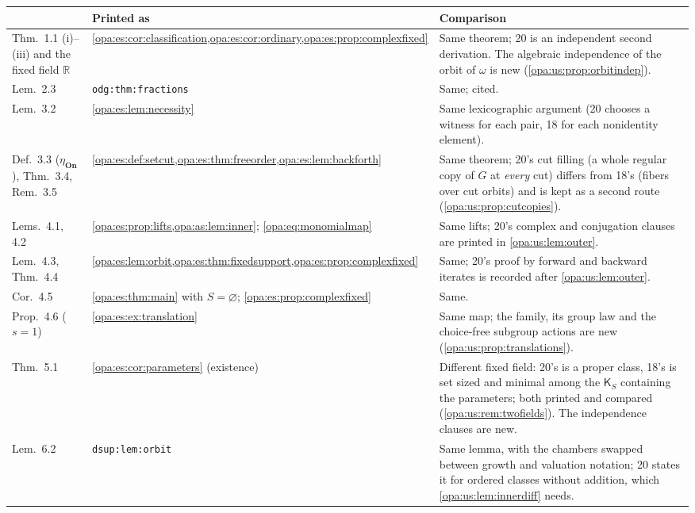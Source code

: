 \documentclass[11pt,oneside]{article}
\numberwithin{equation}{section}
\theoremstyle{definition}
\theoremstyle{remark}
\newcommand{\R}{\mathbb R}
\newcommand{\lbl}[1]{\nolinkurl{#1}}
\newcommand{\On}{\mathbf{On}}
\begin{document}
\begin{center}
\renewcommand{\arraystretch}{1.15}
\begin{longtable}{>{\raggedright\arraybackslash}p{}>{\raggedright\arraybackslash}p{}>{\raggedright\arraybackslash}p{}}
\toprule
20 & Printed as & Comparison\\
\midrule
\endhead
Thm.~1.1 (i)--(iii) and the fixed field $\R$ & \cref{opa:es:cor:classification,opa:es:cor:ordinary,opa:es:prop:complexfixed} & Same theorem;
20 is an independent second derivation. The algebraic independence of the orbit of $\omega$ is new (\cref{opa:us:prop:orbitindep}).\\
Lem.~2.3 & \lbl{odg:thm:fractions} & Same; cited.\\
Lem.~3.2 & \cref{opa:es:lem:necessity} & Same lexicographic argument (20 chooses a witness for each pair, 18 for each
nonidentity element).\\
Def.~3.3 ($\eta_\On$), Thm.~3.4, Rem.~3.5 & \cref{opa:es:def:setcut,opa:es:thm:freeorder,opa:es:lem:backforth} & Same theorem; 20's cut filling
(a whole regular copy of $G$ at \emph{every} cut) differs from 18's (fibers over cut orbits) and is kept as a second route
(\cref{opa:us:prop:cutcopies}).\\
Lems.~4.1, 4.2 & \cref{opa:es:prop:lifts,opa:as:lem:inner}; \eqref{opa:eq:monomialmap} & Same lifts; 20's complex and
conjugation clauses are printed in \cref{opa:us:lem:outer}.\\
Lem.~4.3, Thm.~4.4 & \cref{opa:es:lem:orbit,opa:es:thm:fixedsupport,opa:es:prop:complexfixed} & Same; 20's proof by forward and
backward iterates is recorded after \cref{opa:us:lem:outer}.\\
Cor.~4.5 & \cref{opa:es:thm:main} with $S=\varnothing$; \cref{opa:es:prop:complexfixed} & Same.\\
Prop.~4.6 ($s=1$) & \cref{opa:es:ex:translation} & Same map; the family, its group law and the choice-free subgroup actions are
new (\cref{opa:us:prop:translations}).\\
Thm.~5.1 & \cref{opa:es:cor:parameters} (existence) & Different fixed field: 20's is a proper class, 18's is set sized and minimal among
the $\mathsf K_S$ containing the parameters; both printed and compared (\cref{opa:us:rem:twofields}). The independence clauses are new.\\
Lem.~6.2 & \lbl{dsup:lem:orbit} & Same lemma, with the chambers swapped between growth and valuation notation; 20 states it for
ordered classes without addition, which \cref{opa:us:lem:innerdiff} needs.\\

\end{longtable}
\end{center}
\end{document}
